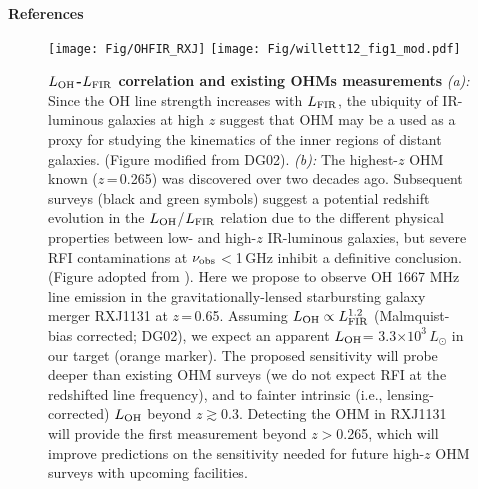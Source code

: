\documentclass[letterpaper,11pt]{article}
\newcommand{\Lsun}{\mbox{$L_{\odot}$}\xspace}
\newcommand{\LFIR}{\mbox{$L_{\rm FIR}$}\xspace}
\newcommand{\LOH}{$L_{\rm OH}$\xspace}
\newcommand{\E}[1]{\mbox{$\times10^{#1}$}}
\newcommand{\eq}{\,=\,}
\begin{document}
\noindent \textbf{References}
{\fontsize{10pt}{12pt}\selectfont
    
}
\vspace{-0.9em}


\begin{figure}[ptbh]
\texttt{[image: Fig/OHFIR\_RXJ]} %
\texttt{[image: Fig/willett12\_fig1\_mod.pdf]}
\vspace{-0.5em}
\caption{{\bf \LOH-\LFIR correlation and existing OHMs measurements}
{\it (a):} Since the OH line strength increases with \LFIR,
the ubiquity of IR-luminous galaxies at high $z$ suggest that OHM may be a used as a proxy for
studying the kinematics of the inner regions of distant galaxies.
(Figure modified from DG02).
{\it (b):} The highest-$z$ OHM known ($z$\eq0.265) was discovered over two decades ago.
Subsequent surveys (black and green symbols) suggest a potential redshift evolution in the \LOH/\LFIR relation
due to the different physical properties between low- and high-$z$ IR-luminous galaxies, but 
severe RFI contaminations at $\nu_{\rm obs}$$<$1\,GHz inhibit a definitive conclusion. (Figure adopted from
\citealt{Willett12a}).
Here we propose to observe OH 1667 MHz line emission in the gravitationally-lensed starbursting
galaxy merger RXJ1131 at $z$\eq0.65.
Assuming $L_{\rm OH}\propto L_{\rm FIR}^{1.2}$ (Malmquist-bias corrected; DG02),
we expect an apparent \LOH= 3.3\E{3}\,\Lsun in our target (orange marker). The proposed sensitivity will
probe deeper than existing OHM surveys (we do not expect RFI at the 
redshifted line frequency), 
and to fainter intrinsic (i.e., lensing-corrected) \LOH beyond $z$$\gtrsim$0.3.
Detecting the OHM in RXJ1131 will provide the first measurement beyond $z$$>$0.265,
which will improve predictions on the sensitivity needed for future high-$z$ OHM surveys with upcoming facilities.
\label{fig:model}}
\end{figure}
\end{document}

